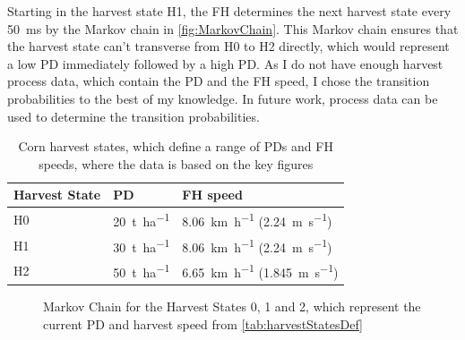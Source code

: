 Starting in the harvest state H1, the \ac{FH} determines the next harvest state every \SI{50}{\milli\second}
by the Markov chain in \autoref{fig:MarkovChain}.
This Markov chain ensures that the harvest state can't transverse from H0 to H2 directly, which would represent
a low \ac{PD} immediately followed by a high \ac{PD}.
As I do not have enough harvest process data, which contain the \ac{PD} and the \ac{FH} speed,
I chose the transition probabilities to the best of my knowledge.
In future work, process data can be used to determine
the transition probabilities.

\begin{table}[H]
	\centering
	\begin{tabular}{>{\centering}p{2cm}p{4cm}p{4cm}}
		\toprule
		Harvest State & \ac{PD} & \ac{FH} speed\\
		\midrule
		H0 & \SI{20}{\tonne\per\hectare}
        & \SI{8.06}{\kilo\metre\per\hour} (\SI{2.24}{\metre\per\second}) \\
		H1 & \SI{30}{\tonne\per\hectare}
        & \SI{8.06}{\kilo\metre\per\hour} (\SI{2.24}{\metre\per\second}) \\
		H2 & \SI{50}{\tonne\per\hectare}
        & \SI{6.65}{\kilo\metre\per\hour} (\SI{1.845}{\metre\per\second}) \\
		\bottomrule
	\end{tabular}
	\caption{Corn harvest states, which define a range of \acf{PD}s and \acf{FH} speeds, where the data is based on the
	key figures \cite{faustzahlen2018}}
	\label{tab:harvestStatesDef}
\end{table}

\begin{figure}[H]
\centering
{}
\caption{Markov Chain for the Harvest States 0, 1 and 2, which represent the current \ac{PD} and
harvest speed from \autoref{tab:harvestStatesDef}}
\label{fig:MarkovChain}
\end{figure}

